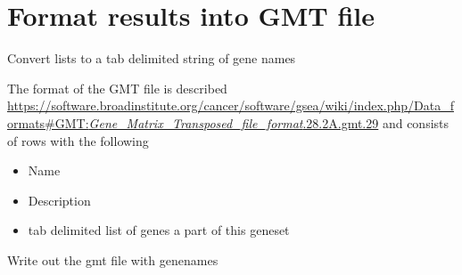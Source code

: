 \documentclass[
]{book}
\newenvironment{Shaded}{\begin{snugshade}}{\end{snugshade}}
\newcommand{\AttributeTok}[1]{\textcolor[rgb]{0.13,0.29,0.53}{#1}}
\newcommand{\ControlFlowTok}[1]{\textcolor[rgb]{0.13,0.29,0.53}{\textbf{#1}}}
\newcommand{\FunctionTok}[1]{\textcolor[rgb]{0.13,0.29,0.53}{\textbf{#1}}}
\newcommand{\NormalTok}[1]{#1}
\newcommand{\OtherTok}[1]{\textcolor[rgb]{0.56,0.35,0.01}{#1}}
\newcommand{\SpecialCharTok}[1]{\textcolor[rgb]{0.81,0.36,0.00}{\textbf{#1}}}
\newcommand{\StringTok}[1]{\textcolor[rgb]{0.31,0.60,0.02}{#1}}
\providecommand{\tightlist}{%
  \setlength{\itemsep}{0pt}\setlength{\parskip}{0pt}}
\begin{document}
\hypertarget{format-results-into-gmt-file-1}{%
\section{Format results into GMT file}\label{format-results-into-gmt-file-1}}

Convert lists to a tab delimited string of gene names

\begin{Shaded}
\end{Shaded}

The format of the GMT file is described \href{here}{https://software.broadinstitute.org/cancer/software/gsea/wiki/index.php/Data\_formats\#GMT:\emph{Gene\_Matrix\_Transposed\_file\_format}.28.2A.gmt.29} and consists of rows with the following

\begin{itemize}
\tightlist
\item
  Name
\item
  Description
\item
  tab delimited list of genes a part of this geneset
\end{itemize}

Write out the gmt file with genenames
\end{document}
